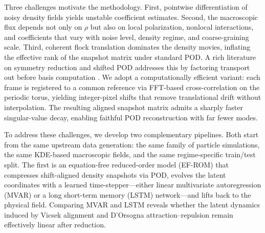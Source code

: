 \documentclass{report}
\theoremstyle{plain}
\theoremstyle{remark}
\numberwithin{equation}{section}              %
\begin{document}
Three challenges motivate the methodology. First, pointwise differentiation of noisy density fields yields unstable coefficient estimates. Second, the macroscopic flux depends not only on $\rho$ but also on local polarization, nonlocal interactions, and coefficients that vary with noise level, density regime, and coarse-graining scale. Third, coherent flock translation dominates the density movies, inflating the effective rank of the snapshot matrix under standard POD. A rich literature on symmetry reduction and shifted POD addresses this by factoring transport out before basis computation \cite{reiss2018shifted_pod,black2020projection,krah2024robust_spod,budanur2015slices,siminos2015periodic,sonday2011alignment}. We adopt a computationally efficient variant: each frame is registered to a common reference via FFT-based cross-correlation on the periodic torus, yielding integer-pixel shifts that remove translational drift without interpolation. The resulting aligned snapshot matrix admits a sharply faster singular-value decay, enabling faithful POD reconstruction with far fewer modes.

To address these challenges, we develop two complementary pipelines. Both start from the same upstream data generation: the same family of particle simulations, the same KDE-based macroscopic fields, and the same regime-specific train/test split. The first is an equation-free reduced-order model (EF-ROM) that compresses shift-aligned density snapshots via POD, evolves the latent coordinates with a learned time-stepper---either linear multivariate autoregression (MVAR) or a long short-term memory (LSTM) network---and lifts back to the physical field. Comparing MVAR and LSTM reveals whether the latent dynamics induced by Vicsek \cite{vicsek1995vicsek} alignment and D'Orsogna \cite{dorsogna2006morse} attraction--repulsion remain effectively linear after reduction.
\end{document}

